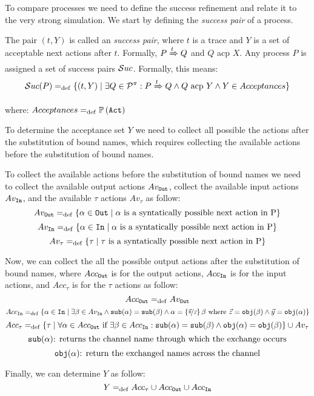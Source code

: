 To compare \picalc{} processes we need to define the success refinement and relate it to the very strong simulation. We start by defining the \textit{success pair} of a process.

The pair $(t, Y)$ is called an \textit{success pair}, where $t$ is a trace and $Y$ is a set of acceptable next actions after $t$. Formally, $P \xRightarrow{t} Q$ and $Q$ acp $X$. Any process
$P$ is assigned a set of success pairs $\Successes[]$. Formally, this means:
\begin{align}
    \Successes[P] \define \{(t,Y) \mid \exists Q\in\procs: P \bigstep{t} Q \wedge Q \text{ acp } Y \wedge Y\in Acceptances\}
\end{align}

where: $Acceptances =_{\mathrm{def}} \mathbb P\left(\mathtt{Act}\right)$

To determine the acceptance set $Y$ we need to collect all possible the actions after the substitution of bound names, which requires collecting the available actions before the substitution of bound names.

To collect the available actions before the substitution of bound names we need to collect the available output actions $Av_{\mathtt{Out}}$, collect the available input actions $Av_{\mathtt{In}}$, and the available $\tau$ actions $Av_\tau$ as follow:
\[Av_{\mathtt{Out}}=_{\mathrm{def}}\{ \alpha \in \mathtt{Out} \mid \alpha\text{ is a syntatically possible next action in P}\}\]
\[Av_{\mathtt{In}}=_{\mathrm{def}}\{ \alpha \in \mathtt{In} \mid \alpha\text{ is a syntatically possible next action in P}\}\]
\[Av_\tau=_{\mathrm{def}}\{ \tau \mid \tau\text{ is a syntatically possible next action in P}\}\]

Now, we can collect the all the possible output actions after the substitution of bound names, where $Acc_{\mathtt{Out}}$ is for the output actions, $Acc_{\mathtt{In}}$ is for the input actions, and $Acc_\tau$ is for the $\tau$ actions as follow:
\[Acc_{\mathtt{Out}} =_{\mathrm{def}} Av_{\mathtt{Out}}\]
$Acc_{\mathtt{In}}=_{\mathrm{def}}\{\alpha \in \mathtt{In} \mid \exists \beta \in Av_{\mathtt{In}} \wedge \mathtt{sub}(\alpha)=\mathtt{sub}(\beta) \wedge \alpha=\left\{\nicefrac{\vec{y}}{\vec{z}}\right\}\beta \text{ where } \vec{z}=\mathtt{obj}(\beta) \wedge \vec{y}=\mathtt{obj}(\alpha) \}$
\[Acc_\tau=_{\mathrm{def}}\{\tau \mid \forall \alpha \in Acc_{\mathtt{Out}} \text{ if } \exists \beta \in Acc_{\mathtt{In}}  :\mathtt{sub}(\alpha)=\mathtt{sub}(\beta) \wedge \mathtt{obj}(\alpha)=\mathtt{obj}(\beta)  \}\cup Av_\tau\]
\[\mathtt{sub}(\alpha) \text{: returns the channel name through which the exchange occurs}\]
\[\mathtt{obj}(\alpha) \text{: return the exchanged names across the channel}\]

Finally, we can determine $Y$ as follow:
\[Y =_{\mathrm{def}} Acc_\tau \cup Acc_{\mathtt{Out}} \cup Acc_{\mathtt{In}}\]

